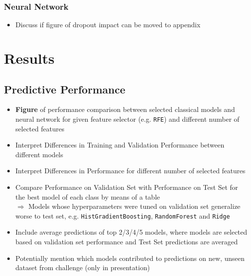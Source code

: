 \documentclass[12pt, letterpaper]{article}
\begin{document}
\subsubsection{Neural Network} %

\begin{itemize}
    \item Discuss if figure of dropout impact can be moved to appendix
\end{itemize}



\section{Results} %


\subsection{Predictive Performance} %
\begin{itemize}
    \item \textbf{Figure} of performance comparison between selected classical models and neural network for given feature selector (e.g. \texttt{RFE}) and different number of selected features
    \item Interpret Differences in Training and Validation Performance between different models
    \item Interpret Differences in Performance for different number of selected features
    \item Compare Performance on Validation Set with Performance on Test Set for the best model of each class by means of a table \\
          $\Rightarrow$ Models whose hyperparameters were tuned on validation set generalize worse to test set, e.g. \texttt{HistGradientBoosting}, \texttt{RandomForest} and \texttt{Ridge}
    \item Include average predictions of top 2/3/4/5 models, where models are selected based on validation set performance and Test Set predictions are averaged
    \item Potentially mention which models contributed to predictions on new, unseen dataset from challenge (only in presentation)
\end{itemize}
\end{document}
